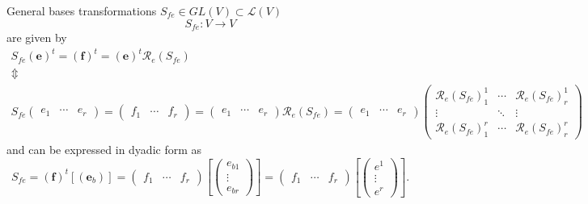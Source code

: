 \documentclass[aps,preprint]{revtex4}
\begin{document}
General bases transformations $S_{fe}\in GL\left( V\right) \subset \mathcal{L%
}\left( V\right) $ 
\begin{equation}
S_{fe}:V\rightarrow V
\end{equation}%
are given by 
\begin{gather}
S_{fe}\left( \boldsymbol{e}\right) ^{t}=\left( \boldsymbol{f}\right)
^{t}=\left( \boldsymbol{e}\right) ^{t}\mathcal{R}_{e}\left( S_{fe}\right) \\
\Updownarrow \\
S_{fe}\left( 
\begin{array}{ccc}
e_{1} & \cdots & e_{r}%
\end{array}%
\right) =\left( 
\begin{array}{ccc}
f_{1} & \cdots & f_{r}%
\end{array}%
\right) =\left( 
\begin{array}{ccc}
e_{1} & \cdots & e_{r}%
\end{array}%
\right) \mathcal{R}_{e}\left( S_{fe}\right) =\left( 
\begin{array}{ccc}
e_{1} & \cdots & e_{r}%
\end{array}%
\right) \left( 
\begin{array}{ccc}
\mathcal{R}_{e}\left( S_{fe}\right) _{1}^{1} & \cdots & \mathcal{R}%
_{e}\left( S_{fe}\right) _{r}^{1} \\ 
\vdots & \ddots & \vdots \\ 
\mathcal{R}_{e}\left( S_{fe}\right) _{1}^{r} & \cdots & \mathcal{R}%
_{e}\left( S_{fe}\right) _{r}^{r}%
\end{array}%
\right)
\end{gather}%
and can be expressed in dyadic form as 
\begin{equation}
S_{fe}=\left( \boldsymbol{f}\right) ^{t}\left[ \left( \boldsymbol{e}%
_{b}\right) \right] =\left( 
\begin{array}{ccc}
f_{1} & \cdots & f_{r}%
\end{array}%
\right) \left[ \left( 
\begin{array}{c}
e_{b1} \\ 
\vdots \\ 
e_{br}%
\end{array}%
\right) \right] =\left( 
\begin{array}{ccc}
f_{1} & \cdots & f_{r}%
\end{array}%
\right) \left[ \left( 
\begin{array}{c}
e^{1} \\ 
\vdots \\ 
e^{r}%
\end{array}%
\right) \right] .
\end{equation}
\end{document}
